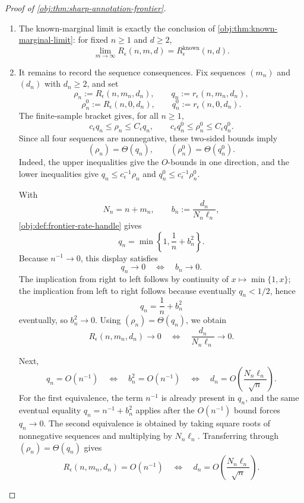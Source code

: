 \begin{proof}[Proof of \cref{obj:thm:sharp-annotation-frontier}]
\begin{enumerate}
\item The known-marginal limit is exactly the conclusion of \cref{obj:thm:known-marginal-limit}: for fixed \(n\ge1\) and \(d\ge2\),
\[
\lim_{m\to\infty} R_\epsilon(n,m,d)
=
R_\epsilon^{\mathrm{known}}(n,d).
\]

\item It remains to record the sequence consequences.  Fix sequences \((m_n)\) and \((d_n)\) with \(d_n\ge2\), and set
\[
\rho_n:=R_\epsilon(n,m_n,d_n),\qquad
q_n:=r_\epsilon(n,m_n,d_n),
\]
\[
\rho_n^{0}:=R_\epsilon(n,0,d_n),\qquad
q_n^{0}:=r_\epsilon(n,0,d_n).
\]
The finite-sample bracket gives, for all \(n\ge1\),
\[
c_\epsilon q_n\le \rho_n\le C_\epsilon q_n,
\qquad
c_\epsilon q_n^{0}\le \rho_n^{0}\le C_\epsilon q_n^{0}.
\]
Since all four sequences are nonnegative, these two-sided bounds imply
\[
(\rho_n)=\Theta(q_n),
\qquad
(\rho_n^{0})=\Theta(q_n^{0}).
\]
Indeed, the upper inequalities give the \(O\)-bounds in one direction, and the lower inequalities give
\(q_n\le c_\epsilon^{-1}\rho_n\) and
\(q_n^{0}\le c_\epsilon^{-1}\rho_n^{0}\). %

With
\[
N_n=n+m_n,\qquad
b_n:=\frac{d_n}{N_n\ell_n},
\]
\cref{obj:def:frontier-rate-handle} gives
\[
q_n=\min\left\{1,\frac1n+b_n^2\right\}.
\]
Because \(n^{-1}\to0\), this display satisfies
\[
q_n\to0
\quad\Longleftrightarrow\quad
b_n\to0.
\]
The implication from right to left follows by continuity of \(x\mapsto\min\{1,x\}\); the implication from left to right follows because eventually \(q_n<1/2\), hence
\[
q_n=\frac1n+b_n^2
\]
eventually, so \(b_n^2\to0\).  Using \((\rho_n)=\Theta(q_n)\), we obtain
\[
R_\epsilon(n,m_n,d_n)\to0
\quad\Longleftrightarrow\quad
\frac{d_n}{N_n\ell_n}\to0.
\]

Next,
\[
q_n=O(n^{-1})
\quad\Longleftrightarrow\quad
b_n^2=O(n^{-1})
\quad\Longleftrightarrow\quad
d_n=O\!\left(\frac{N_n\ell_n}{\sqrt n}\right).
\]
For the first equivalence, the term \(n^{-1}\) is already present in \(q_n\), and the same eventual equality
\(q_n=n^{-1}+b_n^2\) applies after the \(O(n^{-1})\) bound forces \(q_n\to0\).  The second equivalence is obtained by taking square roots of nonnegative sequences and multiplying by \(N_n\ell_n\).  Transferring through \((\rho_n)=\Theta(q_n)\) gives
\[
R_\epsilon(n,m_n,d_n)=O(n^{-1})
\quad\Longleftrightarrow\quad
d_n=O\!\left(\frac{N_n\ell_n}{\sqrt n}\right).
\]


\end{enumerate}
\end{proof}
